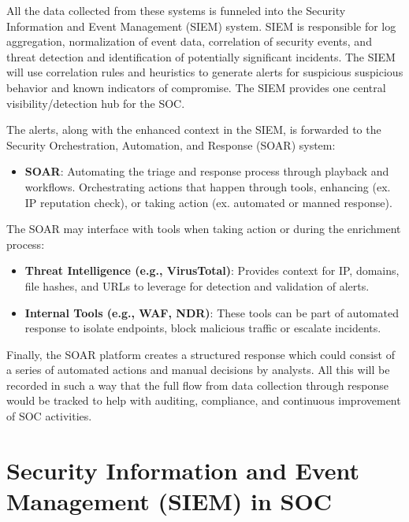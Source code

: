 All the data collected from these systems is funneled into the Security Information and Event Management (SIEM) system. SIEM is responsible for log aggregation, normalization of event data, correlation of security events, and threat detection and identification of potentially significant incidents. The SIEM will use correlation rules and heuristics to generate alerts for suspicious suspicious behavior and known indicators of compromise. The SIEM provides one central visibility/detection hub for the SOC. 

The alerts, along with the enhanced context in the SIEM, is forwarded to the Security Orchestration, Automation, and Response (SOAR) system:

\begin{itemize}[itemsep=0pt,parsep=0pt,topsep=0pt,partopsep=0pt]
    \item \textbf{SOAR}: Automating the triage and response process through playback and workflows. Orchestrating actions that happen through tools, enhancing (ex. IP reputation check), or taking action (ex. automated or manned response).
\end{itemize}

The SOAR may interface with tools when taking action or during the enrichment process:

\begin{itemize}[itemsep=0pt,parsep=0pt,topsep=0pt,partopsep=0pt]
    \item \textbf{Threat Intelligence (e.g., VirusTotal)}: Provides context for IP, domains, file hashes, and URLs to leverage for detection and validation of alerts.
    \item \textbf{Internal Tools (e.g., WAF, NDR)}: These tools can be part of automated response to isolate endpoints, block malicious traffic or escalate incidents.
\end{itemize}

Finally, the SOAR platform creates a structured response which could consist of a series of automated actions and manual decisions by analysts. All this will be recorded in such a way that the full flow from data collection through response would be tracked to help with auditing, compliance, and continuous improvement of SOC activities.

\section{Security Information and Event Management (SIEM) in SOC}


